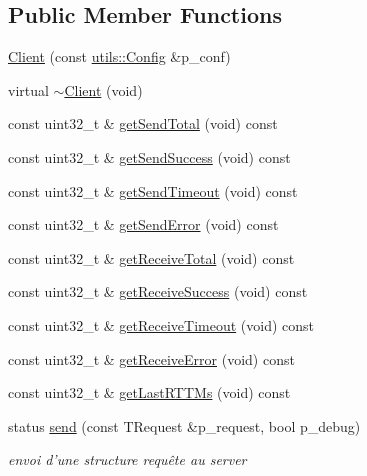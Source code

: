 \subsection*{Public Member Functions}
\begin{DoxyCompactItemize}
\item 
\hyperlink{classxtd_1_1network_1_1bip_1_1Client_a49c9e08bee4169c40c92d9870d882295}{Client} (const \hyperlink{classxtd_1_1network_1_1utils_1_1Config}{utils\-::\-Config} \&p\-\_\-conf)
\item 
virtual \hyperlink{classxtd_1_1network_1_1bip_1_1Client_ac16a5d30bae2e5ac5ae616034943d219}{$\sim$\-Client} (void)
\item 
const uint32\-\_\-t \& \hyperlink{classxtd_1_1network_1_1bip_1_1Client_ad9097285a9937b9b16922ea3f5154cd2}{get\-Send\-Total} (void) const 
\item 
const uint32\-\_\-t \& \hyperlink{classxtd_1_1network_1_1bip_1_1Client_ae0112d61b8a18823bffb8c7b3bde9b4d}{get\-Send\-Success} (void) const 
\item 
const uint32\-\_\-t \& \hyperlink{classxtd_1_1network_1_1bip_1_1Client_ad7b29723945a80df67837c41b4570272}{get\-Send\-Timeout} (void) const 
\item 
const uint32\-\_\-t \& \hyperlink{classxtd_1_1network_1_1bip_1_1Client_afa332d8733f5a96b85546de8dc37dffc}{get\-Send\-Error} (void) const 
\item 
const uint32\-\_\-t \& \hyperlink{classxtd_1_1network_1_1bip_1_1Client_af8c4e73103c9e483f78c9b62496daf47}{get\-Receive\-Total} (void) const 
\item 
const uint32\-\_\-t \& \hyperlink{classxtd_1_1network_1_1bip_1_1Client_a7fb2624e39723bae24d8286b98795e70}{get\-Receive\-Success} (void) const 
\item 
const uint32\-\_\-t \& \hyperlink{classxtd_1_1network_1_1bip_1_1Client_adfcc8fafdf138d104d78133ff5f419df}{get\-Receive\-Timeout} (void) const 
\item 
const uint32\-\_\-t \& \hyperlink{classxtd_1_1network_1_1bip_1_1Client_ab04f56d8e2cb6ac3d7fdaa2e1791c7cd}{get\-Receive\-Error} (void) const 
\item 
const uint32\-\_\-t \& \hyperlink{classxtd_1_1network_1_1bip_1_1Client_a44ee99fff5318cdd6e6b54b4b5e2f62f}{get\-Last\-R\-T\-T\-Ms} (void) const 
\item 
status \hyperlink{classxtd_1_1network_1_1bip_1_1Client_acda47c19d4fc71705f4db91226cec1b9}{send} (const T\-Request \&p\-\_\-request, bool p\-\_\-debug)
\begin{DoxyCompactList}\small\item\em envoi d'une structure requête au server \end{DoxyCompactList}\item 

\end{DoxyCompactItemize}
